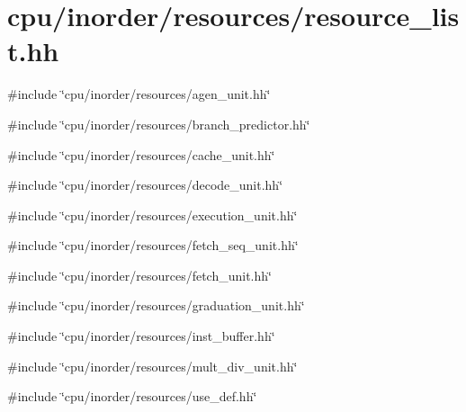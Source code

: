 \hypertarget{resource__list_8hh}{
\section{cpu/inorder/resources/resource\_\-list.hh}
\label{resource__list_8hh}
}
{\ttfamily \#include \char`\"{}cpu/inorder/resources/agen\_\-unit.hh\char`\"{}}\par
{\ttfamily \#include \char`\"{}cpu/inorder/resources/branch\_\-predictor.hh\char`\"{}}\par
{\ttfamily \#include \char`\"{}cpu/inorder/resources/cache\_\-unit.hh\char`\"{}}\par
{\ttfamily \#include \char`\"{}cpu/inorder/resources/decode\_\-unit.hh\char`\"{}}\par
{\ttfamily \#include \char`\"{}cpu/inorder/resources/execution\_\-unit.hh\char`\"{}}\par
{\ttfamily \#include \char`\"{}cpu/inorder/resources/fetch\_\-seq\_\-unit.hh\char`\"{}}\par
{\ttfamily \#include \char`\"{}cpu/inorder/resources/fetch\_\-unit.hh\char`\"{}}\par
{\ttfamily \#include \char`\"{}cpu/inorder/resources/graduation\_\-unit.hh\char`\"{}}\par
{\ttfamily \#include \char`\"{}cpu/inorder/resources/inst\_\-buffer.hh\char`\"{}}\par
{\ttfamily \#include \char`\"{}cpu/inorder/resources/mult\_\-div\_\-unit.hh\char`\"{}}\par
{\ttfamily \#include \char`\"{}cpu/inorder/resources/use\_\-def.hh\char`\"{}}\par
